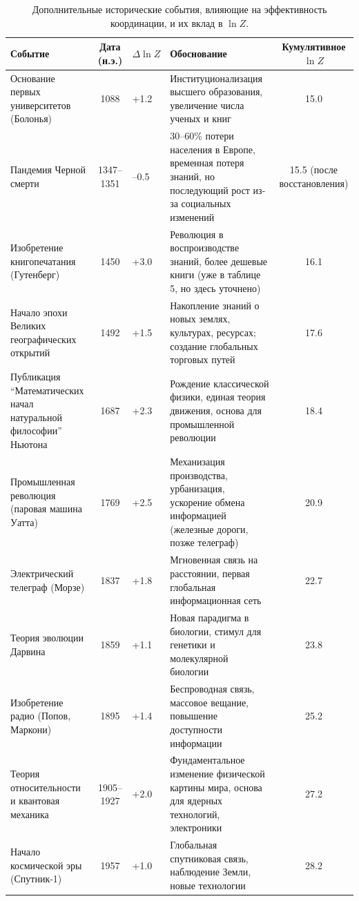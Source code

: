 \documentclass[12pt,a4paper]{article}
\theoremstyle{remark}
\begin{document}
	\begin{table}[htbp]
		\centering
		\caption{Дополнительные исторические события, влияющие на эффективность координации, и их вклад в $\ln Z$.}
		\label{tab:expanded-events}
		\scriptsize  
		\begin{tabular}{p{3.2cm} c p{2.5cm} p{4.5cm} c}
			\toprule
			\textbf{Событие} & \textbf{Дата (н.э.)} & \textbf{$\Delta \ln Z$} & \textbf{Обоснование} & \textbf{Кумулятивное $\ln Z$} \\
			\midrule
			Основание первых университетов (Болонья) & 1088 & +1.2 & Институционализация высшего образования, увеличение числа ученых и книг & 15.0 \\
			Пандемия Черной смерти & 1347–1351 & –0.5 & 30–60\% потери населения в Европе, временная потеря знаний, но последующий рост из-за социальных изменений & 15.5 (после восстановления) \\
			Изобретение книгопечатания (Гутенберг) & 1450 & +3.0 & Революция в воспроизводстве знаний, более дешевые книги (уже в таблице 5, но здесь уточнено) & 16.1 \\
			Начало эпохи Великих географических открытий & 1492 & +1.5 & Накопление знаний о новых землях, культурах, ресурсах; создание глобальных торговых путей & 17.6 \\
			Публикация ``Математических начал натуральной философии'' Ньютона & 1687 & +2.3 & Рождение классической физики, единая теория движения, основа для промышленной революции & 18.4 \\
			Промышленная революция (паровая машина Уатта) & 1769 & +2.5 & Механизация производства, урбанизация, ускорение обмена информацией (железные дороги, позже телеграф) & 20.9 \\
			Электрический телеграф (Морзе) & 1837 & +1.8 & Мгновенная связь на расстоянии, первая глобальная информационная сеть & 22.7 \\
			Теория эволюции Дарвина & 1859 & +1.1 & Новая парадигма в биологии, стимул для генетики и молекулярной биологии & 23.8 \\
			Изобретение радио (Попов, Маркони) & 1895 & +1.4 & Беспроводная связь, массовое вещание, повышение доступности информации & 25.2 \\
			Теория относительности и квантовая механика & 1905–1927 & +2.0 & Фундаментальное изменение физической картины мира, основа для ядерных технологий, электроники & 27.2 \\
			Начало космической эры (Спутник-1) & 1957 & +1.0 & Глобальная спутниковая связь, наблюдение Земли, новые технологии & 28.2 \\

\end{tabular}
\end{table}
\end{document}
